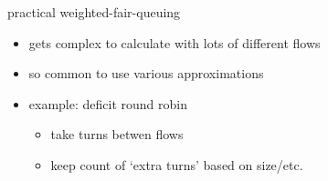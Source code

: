 \begin{frame}{practical weighted-fair-queuing}
    \begin{itemize}
    \item gets complex to calculate with lots of different flows
    \item so common to use various approximations
    \vspace{.5cm}
    \item example: deficit round robin
        \begin{itemize}
        \item take turns betwen flows
        \item keep count of `extra turns' based on size/etc.
        \end{itemize}
    \end{itemize}
\end{frame}
